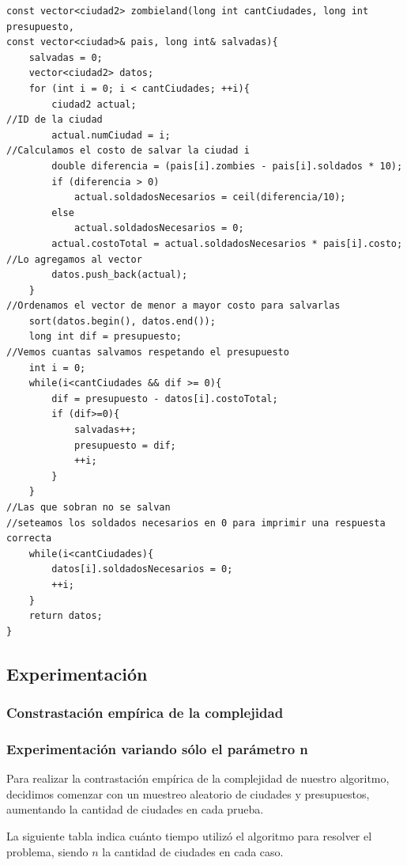 	
	\begin{codesnippet}
	\begin{verbatim}
const vector<ciudad2> zombieland(long int cantCiudades, long int presupuesto, 
const vector<ciudad>& pais, long int& salvadas){
    salvadas = 0;
    vector<ciudad2> datos;
    for (int i = 0; i < cantCiudades; ++i){
        ciudad2 actual;
//ID de la ciudad
        actual.numCiudad = i;
//Calculamos el costo de salvar la ciudad i
        double diferencia = (pais[i].zombies - pais[i].soldados * 10);
        if (diferencia > 0)
            actual.soldadosNecesarios = ceil(diferencia/10);
        else
            actual.soldadosNecesarios = 0;
        actual.costoTotal = actual.soldadosNecesarios * pais[i].costo;
//Lo agregamos al vector
        datos.push_back(actual);
    }
//Ordenamos el vector de menor a mayor costo para salvarlas
    sort(datos.begin(), datos.end());
    long int dif = presupuesto;
//Vemos cuantas salvamos respetando el presupuesto
    int i = 0;
    while(i<cantCiudades && dif >= 0){
        dif = presupuesto - datos[i].costoTotal;
        if (dif>=0){
            salvadas++;
            presupuesto = dif;
            ++i;
        }
    }
//Las que sobran no se salvan
//seteamos los soldados necesarios en 0 para imprimir una respuesta correcta
    while(i<cantCiudades){
        datos[i].soldadosNecesarios = 0;
        ++i;
    }
    return datos;
}
	\end{verbatim}
	\end{codesnippet}
\newpage
\subsection{Experimentaci\'on}

\subsubsection{Constrastaci\'on emp\'irica de la complejidad}


\subsubsection{Experimentaci\'on variando s\'olo el par\'ametro n}

Para realizar la contrastaci\'on emp\'irica de la complejidad de nuestro algoritmo, decidimos comenzar con un muestreo aleatorio de ciudades y presupuestos, aumentando la cantidad de ciudades en cada prueba.

La siguiente tabla indica cu\'anto tiempo utiliz\'o el algoritmo para resolver el problema, siendo $n$ la cantidad de ciudades en cada caso.


